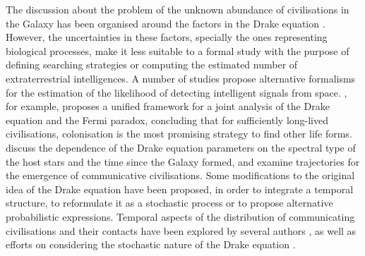 \documentclass[crop]{CSLB}
\begin{document}
\Fpagebreak


The discussion about the problem of the unknown abundance of
civilisations in the Galaxy has been organised around the factors in
the Drake equation \citep{hinkel_interdisciplinary_2019}.
%
However, the uncertainties in these factors, specially the ones
representing biological processes, make it less suitable to a formal
study with the purpose of defining searching strategies or computing
the estimated number of extraterrestrial intelligences.
%
A number of studies propose alternative formalisms for the estimation
of the likelihood of detecting intelligent signals from space.
%
\citet{prantzos_joint_2013}, for example, proposes a unified framework
for a joint analysis of the Drake equation and the Fermi paradox,
concluding that for sufficiently long-lived civilisations,
colonisation is the most promising strategy to find other life forms.
%
\citet{haqq-misra_drake_2017} discuss the dependence of the Drake
equation parameters on the spectral type of the host stars and the
time since the Galaxy formed, and examine trajectories for the
emergence of communicative civilisations.
%
Some modifications to the original idea of the Drake equation have
been proposed, in order to integrate a temporal structure, to
reformulate it as a stochastic process or to propose alternative
probabilistic expressions.
%
Temporal aspects of the distribution of communicating civilisations
and their contacts have been explored by several authors
\citep{fogg_temporal_1987, forgan_spatiotemporal_2011,
balbi_impact_2018, balbi_spatiotemporal_2018, horvat_impact_2011}, as
well as efforts on considering the stochastic nature of the Drake
equation \citep{glade_stochastic_2011}.
\end{document}
